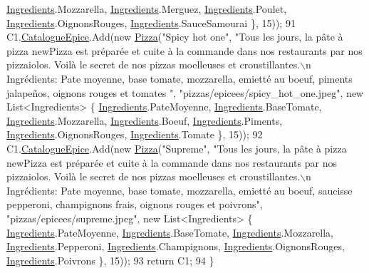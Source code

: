 \begin{DoxyCode}
      \hyperlink{namespaceModele_a001a8e89e56a724f24a249ba98080d41}{Ingredients}.Mozzarella, \hyperlink{namespaceModele_a001a8e89e56a724f24a249ba98080d41}{Ingredients}.Merguez, \hyperlink{namespaceModele_a001a8e89e56a724f24a249ba98080d41}{Ingredients}.Poulet, 
      \hyperlink{namespaceModele_a001a8e89e56a724f24a249ba98080d41}{Ingredients}.OignonsRouges, \hyperlink{namespaceModele_a001a8e89e56a724f24a249ba98080d41}{Ingredients}.SauceSamourai \}, 15));
91             C1.\hyperlink{classModele_1_1Catalogue_a633610212f42551a5755212e21bedbca}{CatalogueEpice}.Add(\textcolor{keyword}{new} \hyperlink{classModele_1_1Pizza}{Pizza}(\textcolor{stringliteral}{"Spicy hot one"}, \textcolor{stringliteral}{"Tous les jours, la pâte à
       pizza newPizza est préparée et cuite à la commande dans nos restaurants par nos pizzaiolos. Voilà le secret
       de nos pizzas moelleuses et croustillantes.\(\backslash\)n Ingrédients: Pate moyenne, base tomate, mozzarella, emietté au
       boeuf, piments jalapeños, oignons rouges et tomates "}, \textcolor{stringliteral}{"pizzas/epicees/spicy\_hot\_one.jpeg"}, \textcolor{keyword}{new} 
      List<Ingredients> \{ \hyperlink{namespaceModele_a001a8e89e56a724f24a249ba98080d41}{Ingredients}.PateMoyenne, \hyperlink{namespaceModele_a001a8e89e56a724f24a249ba98080d41}{Ingredients}.BaseTomate, 
      \hyperlink{namespaceModele_a001a8e89e56a724f24a249ba98080d41}{Ingredients}.Mozzarella, \hyperlink{namespaceModele_a001a8e89e56a724f24a249ba98080d41}{Ingredients}.Boeuf, \hyperlink{namespaceModele_a001a8e89e56a724f24a249ba98080d41}{Ingredients}.Piments, 
      \hyperlink{namespaceModele_a001a8e89e56a724f24a249ba98080d41}{Ingredients}.OignonsRouges, \hyperlink{namespaceModele_a001a8e89e56a724f24a249ba98080d41}{Ingredients}.Tomate \}, 15));
92             C1.\hyperlink{classModele_1_1Catalogue_a633610212f42551a5755212e21bedbca}{CatalogueEpice}.Add(\textcolor{keyword}{new} \hyperlink{classModele_1_1Pizza}{Pizza}(\textcolor{stringliteral}{"Supreme"}, \textcolor{stringliteral}{"Tous les jours, la pâte à pizza
       newPizza est préparée et cuite à la commande dans nos restaurants par nos pizzaiolos. Voilà le secret de nos
       pizzas moelleuses et croustillantes.\(\backslash\)n Ingrédients: Pate moyenne, base tomate, mozzarella, emietté au
       boeuf, saucisse pepperoni, champignons frais, oignons rouges et poivrons"}, \textcolor{stringliteral}{"pizzas/epicees/supreme.jpeg"}, \textcolor{keyword}{new} 
      List<Ingredients> \{ \hyperlink{namespaceModele_a001a8e89e56a724f24a249ba98080d41}{Ingredients}.PateMoyenne, \hyperlink{namespaceModele_a001a8e89e56a724f24a249ba98080d41}{Ingredients}.BaseTomate, 
      \hyperlink{namespaceModele_a001a8e89e56a724f24a249ba98080d41}{Ingredients}.Mozzarella, \hyperlink{namespaceModele_a001a8e89e56a724f24a249ba98080d41}{Ingredients}.Pepperoni, \hyperlink{namespaceModele_a001a8e89e56a724f24a249ba98080d41}{Ingredients}.Champignons, 
      \hyperlink{namespaceModele_a001a8e89e56a724f24a249ba98080d41}{Ingredients}.OignonsRouges, \hyperlink{namespaceModele_a001a8e89e56a724f24a249ba98080d41}{Ingredients}.Poivrons \}, 15));
93             \textcolor{keywordflow}{return} C1;
94         \}
\end{DoxyCode}
